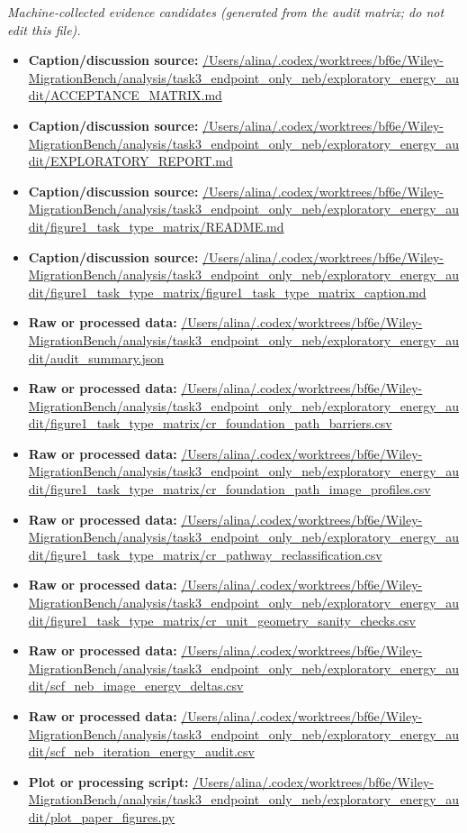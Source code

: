 \emph{Machine-collected evidence candidates (generated from the audit matrix; do not edit this file).}
\begin{itemize}[leftmargin=1.4em,noitemsep]
\item \textbf{Caption/discussion source:} \url{/Users/alina/.codex/worktrees/bf6e/Wiley-MigrationBench/analysis/task3_endpoint_only_neb/exploratory_energy_audit/ACCEPTANCE_MATRIX.md}
\item \textbf{Caption/discussion source:} \url{/Users/alina/.codex/worktrees/bf6e/Wiley-MigrationBench/analysis/task3_endpoint_only_neb/exploratory_energy_audit/EXPLORATORY_REPORT.md}
\item \textbf{Caption/discussion source:} \url{/Users/alina/.codex/worktrees/bf6e/Wiley-MigrationBench/analysis/task3_endpoint_only_neb/exploratory_energy_audit/figure1_task_type_matrix/README.md}
\item \textbf{Caption/discussion source:} \url{/Users/alina/.codex/worktrees/bf6e/Wiley-MigrationBench/analysis/task3_endpoint_only_neb/exploratory_energy_audit/figure1_task_type_matrix/figure1_task_type_matrix_caption.md}
\item \textbf{Raw or processed data:} \url{/Users/alina/.codex/worktrees/bf6e/Wiley-MigrationBench/analysis/task3_endpoint_only_neb/exploratory_energy_audit/audit_summary.json}
\item \textbf{Raw or processed data:} \url{/Users/alina/.codex/worktrees/bf6e/Wiley-MigrationBench/analysis/task3_endpoint_only_neb/exploratory_energy_audit/figure1_task_type_matrix/cr_foundation_path_barriers.csv}
\item \textbf{Raw or processed data:} \url{/Users/alina/.codex/worktrees/bf6e/Wiley-MigrationBench/analysis/task3_endpoint_only_neb/exploratory_energy_audit/figure1_task_type_matrix/cr_foundation_path_image_profiles.csv}
\item \textbf{Raw or processed data:} \url{/Users/alina/.codex/worktrees/bf6e/Wiley-MigrationBench/analysis/task3_endpoint_only_neb/exploratory_energy_audit/figure1_task_type_matrix/cr_pathway_reclassification.csv}
\item \textbf{Raw or processed data:} \url{/Users/alina/.codex/worktrees/bf6e/Wiley-MigrationBench/analysis/task3_endpoint_only_neb/exploratory_energy_audit/figure1_task_type_matrix/cr_unit_geometry_sanity_checks.csv}
\item \textbf{Raw or processed data:} \url{/Users/alina/.codex/worktrees/bf6e/Wiley-MigrationBench/analysis/task3_endpoint_only_neb/exploratory_energy_audit/scf_neb_image_energy_deltas.csv}
\item \textbf{Raw or processed data:} \url{/Users/alina/.codex/worktrees/bf6e/Wiley-MigrationBench/analysis/task3_endpoint_only_neb/exploratory_energy_audit/scf_neb_iteration_energy_audit.csv}
\item \textbf{Plot or processing script:} \url{/Users/alina/.codex/worktrees/bf6e/Wiley-MigrationBench/analysis/task3_endpoint_only_neb/exploratory_energy_audit/plot_paper_figures.py}
\end{itemize}
